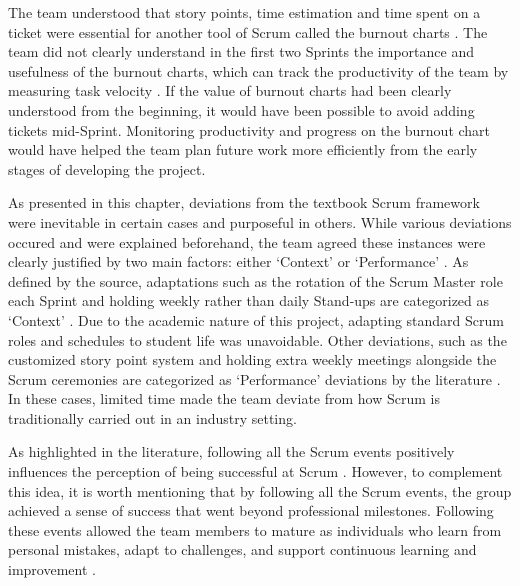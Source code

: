 The team understood that story points, time estimation and time spent on a ticket were essential for another tool of Scrum called the burnout charts \cite{Hron2022}. 
The team did not clearly understand in the first two Sprints the importance and usefulness of the burnout charts, which can track the productivity of the team by measuring task velocity \cite{Hron2022}. 
If the value of burnout charts had been clearly understood from the beginning, it would have been possible to avoid adding tickets mid-Sprint. Monitoring productivity and progress on the burnout chart would have helped the team plan future work more efficiently \cite{Hron2022} from the early stages of developing the project.

As presented in this chapter, deviations from the textbook Scrum framework were inevitable in certain cases and purposeful in others. 
While various deviations occured and were explained beforehand, the team agreed these instances were clearly justified by two main factors: either ‘Context’ or ‘Performance’ \cite{Hron2022}. As defined by the source, adaptations such as the rotation of the Scrum Master role each Sprint and holding weekly rather than daily Stand-ups are categorized as ‘Context’ \cite{Hron2022}. Due to the academic nature of this project, adapting standard Scrum roles and schedules to student life was unavoidable.
Other deviations, such as the customized story point system and holding extra weekly meetings alongside the Scrum ceremonies are categorized as ‘Performance’ deviations by the literature \cite{Hron2022}. In these cases, limited time made the team deviate from how Scrum is traditionally carried out in an industry setting.

As highlighted in the literature, following all the Scrum events positively influences the perception of being successful at Scrum \cite{Kadenic2023}. However, to complement this idea, it is worth mentioning that by following all the Scrum events, the group achieved a sense of success that went beyond professional milestones. Following these events allowed the team members to mature as individuals who learn from personal mistakes, adapt to challenges, and support continuous learning and improvement \cite{Hron2022}.